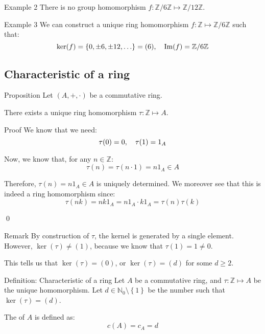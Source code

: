 \documentclass[a4paper]{article}
\begin{document}
\begin{parag}{Example 2}
    There is no group homomorphism $f: \mathbb{Z}/6\mathbb{Z} \mapsto \mathbb{Z}/12\mathbb{Z}$.
\end{parag}

\begin{parag}{Example 3}
    We can construct a unique ring homomorphism $f: \mathbb{Z} \mapsto \mathbb{Z}/6\mathbb{Z}$ such that: 
    \[\ker\left(f\right) = \left\{0, \pm6, \pm12, \ldots\right\} = \left(6\right), \mathspace \im\left(f\right) = \mathbb{Z}/6\mathbb{Z}\]
\end{parag}


\subsection{Characteristic of a ring}

\begin{parag}{Proposition}
    Let $\left(A, +, \cdot \right)$ be a commutative ring.

    There exists a unique ring homomorphism $\tau: \mathbb{Z} \mapsto A$.

    \begin{subparag}{Proof}
        We know that we need: 
        \[\tau\left(0\right) = 0, \mathspace \tau\left(1\right) = 1_A\]
        
        Now, we know that, for any $n \in \mathbb{Z}$: 
        \[\tau\left(n\right) = \tau\left(n\cdot 1\right) = n 1_A \in A\]
        
        Therefore, $\tau\left(n\right) = n 1_A \in A$ is uniquely determined. We moreover see that this is indeed a ring homomorphism since: 
        \[\tau\left(nk\right) = nk 1_A = n 1_A \cdot  k 1_A= \tau\left(n\right)\tau\left(k\right)\]

        \qed
    \end{subparag}

    \begin{subparag}{Remark}
        By construction of $\tau$, the kernel is generated by a single element. However, $\ker\left(\tau\right) \neq \left(1\right)$, because we know that $\tau\left(1\right) = 1 \neq 0$. 

        This tells us that $\ker\left(\tau\right) = \left(0\right)$, or $\ker\left(\tau\right) = \left(d\right)$ for some $d \geq 2$.
    \end{subparag}
\end{parag}

\begin{parag}{Definition: Characteristic of a ring}
    Let $A$ be a commutative ring, and $\tau : \mathbb{Z} \mapsto A$ be the unique homomorphism. Let $d \in \mathbb{N}_0 \setminus \left\{1\right\}$ be the number such that $\ker\left(\tau\right) = \left(d\right)$.

    The  of $A$ is defined as: 
    \[c\left(A\right) = c_A = d\]
\end{parag}
\end{document}
